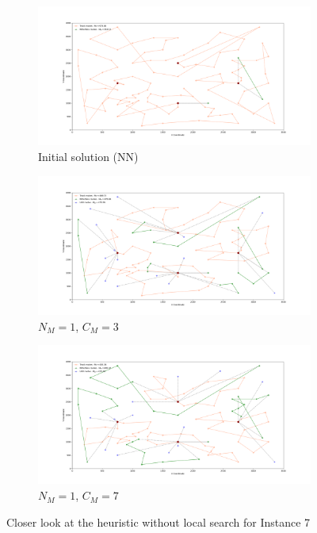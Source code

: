 \documentclass{article}
\begin{document}
	\begin{figure}[h]
		\centering
		\begin{subfigure}{0.33\textwidth}
			\centering
			\includegraphics[scale=0.15]{p07_init}\;
			\caption{Initial solution (NN)}
			\label{fig:p07_init}
		\end{subfigure}
		\hfill
		\begin{subfigure}{0.33\textwidth}
			\centering
			\includegraphics[scale=0.15]{p07_NM1_CM3}\;
			\caption{$N_M=1$, $C_M=3$}
			\label{fig:p07_NM1_CM3}
		\end{subfigure}
		\hfill
		\begin{subfigure}{0.33\textwidth}
			\centering
			\includegraphics[scale=0.15]{p07_NM1_CM7}\;
			\caption{$N_M=1$, $C_M=7$}
			\label{fig:p07_NM1_CM7}
		\end{subfigure}
		\caption{Closer look at the heuristic without local search for Instance 7}
		\label{fig:motorbike_explanation}
	\end{figure}
	
\end{document}
